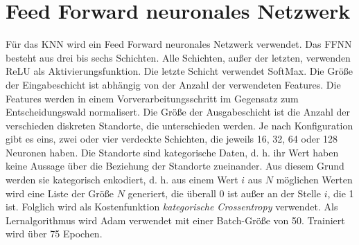 \section{Feed Forward neuronales Netzwerk}
\label{sec:model_ffnn}
Für das KNN wird ein Feed Forward neuronales Netzwerk verwendet.
Das FFNN besteht aus drei bis sechs Schichten.
Alle Schichten, außer der letzten, verwenden ReLU als Aktivierungsfunktion.
Die letzte Schicht verwendet SoftMax.
\newline
\newline
Die Größe der Eingabeschicht ist abhängig von der Anzahl der verwendeten Features.
Die Features werden in einem Vorverarbeitungsschritt im Gegensatz zum Entscheidungswald normalisert.
Die Größe der Ausgabeschicht ist die Anzahl der verschieden diskreten Standorte, die unterschieden werden.
Je nach Konfiguration gibt es eins, zwei oder vier verdeckte Schichten, die jeweils 16, 32, 64 oder 128 Neuronen haben.
\newline
\newline
Die Standorte sind kategorische Daten, d. h. ihr Wert haben keine Aussage über die Beziehung der Standorte zueinander.
Aus diesem Grund werden sie kategorisch enkodiert, d. h. aus einem Wert $i$ aus $N$ möglichen Werten wird eine Liste der Größe $N$ generiert,
die überall 0 ist außer an der Stelle $i$, die 1 ist.
Folglich wird als Kostenfunktion \textit{kategorische Crossentropy} verwendet.
Als Lernalgorithmus wird Adam verwendet mit einer Batch-Größe von 50.
Trainiert wird über 75 Epochen.